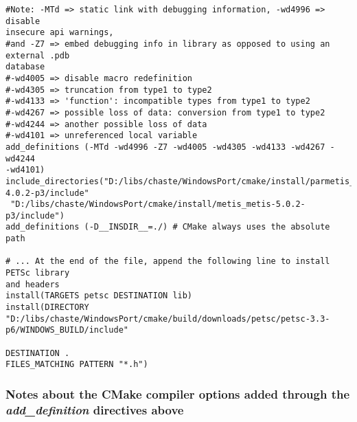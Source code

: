 \documentclass[10pt,a4paper]{article}
\begin{document}
\begin{codeparchment}
\begin{lstlisting}[]
#Note: -MTd => static link with debugging information, -wd4996 => disable
insecure api warnings,
#and -Z7 => embed debugging info in library as opposed to using an external .pdb
database
#-wd4005 => disable macro redefinition
#-wd4305 => truncation from type1 to type2
#-wd4133 => 'function': incompatible types from type1 to type2
#-wd4267 => possible loss of data: conversion from type1 to type2
#-wd4244 => another possible loss of data
#-wd4101 => unreferenced local variable
add_definitions (-MTd -wd4996 -Z7 -wd4005 -wd4305 -wd4133 -wd4267 -wd4244
-wd4101)
include_directories("D:/libs/chaste/WindowsPort/cmake/install/parmetis_parmetis-4.0.2-p3/include"
 "D:/libs/chaste/WindowsPort/cmake/install/metis_metis-5.0.2-p3/include")
add_definitions (-D__INSDIR__=./) # CMake always uses the absolute path

# ... At the end of the file, append the following line to install PETSc library
and headers
install(TARGETS petsc DESTINATION lib)
install(DIRECTORY 
"D:/libs/chaste/WindowsPort/cmake/build/downloads/petsc/petsc-3.3-p6/WINDOWS_BUILD/include"

DESTINATION . 
FILES_MATCHING PATTERN "*.h")

\end{lstlisting}
\end{codeparchment}

\subsubsection{Notes about the CMake compiler options added through the
\textit{add\_definition} directives above}
\end{document}
